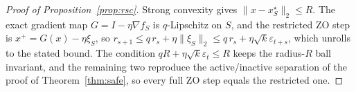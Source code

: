 \documentclass{article}
\newcommand{\eps}{\varepsilon}
\begin{document}
\medskip
\begin{proof}[Proof of Proposition~\ref{prop:rsc}]
Strong convexity gives $\|x-x_S^\star\|_2\le R$. The exact gradient map $G=I-\eta\nabla f_S$ is $q$-Lipschitz on $S$, and the restricted ZO step is $x^+=G(x)-\eta\xi_S$, so
$r_{s+1}\le q\,r_s+\eta\|\xi_S\|_2\le q\,r_s+\eta\sqrt{k}\eps_{t+s}$, which unrolls to the stated bound. The condition $qR+\eta\sqrt{k}\eps_t\le R$ keeps the radius-$R$ ball invariant, and the remaining two reproduce the active/inactive separation of the proof of Theorem~\ref{thm:safe}, so every full ZO step equals the restricted one.
\end{proof}


\FloatBarrier
\balance
\clearpage
\let\spconfthebibliography\thebibliography
\renewcommand{\thebibliography}[1]{\spconfthebibliography{#1}%
  \setlength{\itemsep}{0pt plus 0.5pt}%
  \setlength{\parsep}{0pt}}


\end{document}

